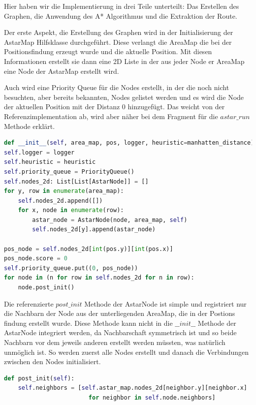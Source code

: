 Hier haben wir die Implementierung in drei Teile unterteilt: Das Erstellen des Graphen, die Anwendung des A* Algorithmus
und die Extraktion der Route.

Der erste Aspekt, die Erstellung des Graphen wird in der Initialisierung der AstarMap Hilfsklasse durchgeführt.
Diese verlangt die AreaMap die bei der Positionsfindung erzeugt wurde und die aktuelle Position.
Mit diesen Informationen erstellt sie dann eine 2D Liste in der aus jeder Node er AreaMap eine Node der AstarMap erstellt
wird.

Auch wird eine Priority Queue für die Nodes erstellt, in der die noch nicht besuchten, aber bereits bekannten, Nodes gelistet
werden und es wird die Node der aktuellen Position mit der Distanz 0 hinzugefügt.
Das weicht von der Referenzimplementation ab, wird aber näher bei dem Fragment für die $astar\_run$ Methode erklärt.
\begin{lstlisting}[language=python,label={lst:astar_map_init}]
def __init__(self, area_map, pos, logger, heuristic=manhatten_distance):
self.logger = logger
self.heuristic = heuristic
self.priority_queue = PriorityQueue()
self.nodes_2d: List[List[AstarNode]] = []
for y, row in enumerate(area_map):
    self.nodes_2d.append([])
    for x, node in enumerate(row):
        astar_node = AstarNode(node, area_map, self)
        self.nodes_2d[y].append(astar_node)

pos_node = self.nodes_2d[int(pos.y)][int(pos.x)]
pos_node.score = 0
self.priority_queue.put((0, pos_node))
for node in (n for row in self.nodes_2d for n in row):
    node.post_init()
\end{lstlisting}

Die referenzierte $post\_init$ Methode der AstarNode ist simple und registriert nur die Nachbarn der Node aus der
unterliegenden AreaMap, die in der Postions findung erstellt wurde.
Diese Methode kann nicht in die $\_\_init\_\_$ Methode der AstarNode integriert werden, da Nachbarschaft symmetrisch ist
und so beide Nachbarn vor dem jeweils anderen erstellt werden müssten, was natürlich unmöglich ist.
So werden zuerst alle Nodes erstellt und danach die Verbindungen zwischen den Nodes initialisiert.
\begin{lstlisting}[language=python,label={lst:astar_node_init}]
def post_init(self):
    self.neighbors = [self.astar_map.nodes_2d[neighbor.y][neighbor.x]
                        for neighbor in self.node.neighbors]
\end{lstlisting}

